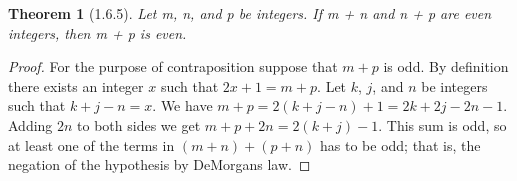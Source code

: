\documentclass[a4paper, 12pt]{article}
\theoremstyle{plain}
\newtheorem*{theorem*}{Theorem}
\begin{document}
	
	\begin{theorem*}[1.6.5]
		Let m, n, and p be integers. If m + n and n + p are even integers, then m + p is even.
	\end{theorem*}
	
	\begin{proof}
		For the purpose of contraposition suppose that $m + p$ is odd. By definition there exists an integer $x$ such that $2x + 1 = m + p$. Let $k$, $j$, and $n$ be integers such that $k + j - n = x$. We have $m + p = 2(k + j - n) + 1 = 2k + 2j - 2n - 1$. Adding $2n$ to both sides we get $m + p + 2n = 2(k + j) - 1$. This sum is odd, so at least one of the terms in $(m + n) + (p + n)$ has to be odd; that is, the negation of the hypothesis by DeMorgans law.
	\end{proof}
\end{document}
